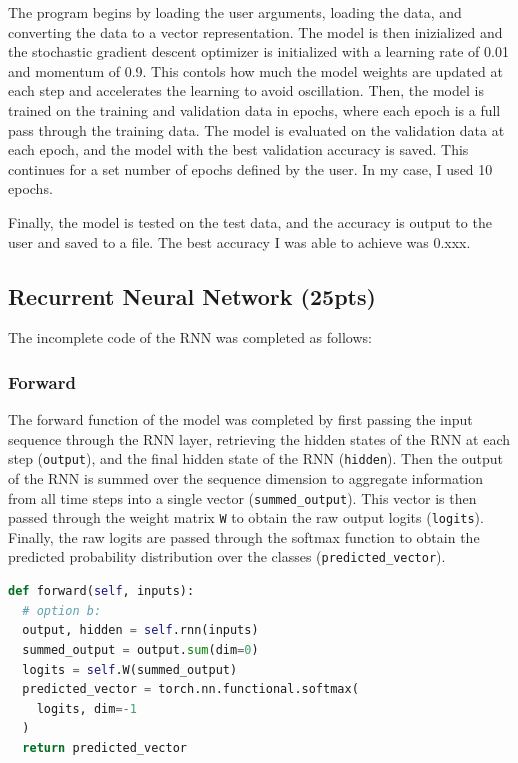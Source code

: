 \documentclass[conference]{IEEEtran}
\begin{document}
The program begins by loading the user arguments, loading the data, and converting the data to a vector representation. The model is then inizialized and the stochastic gradient descent optimizer is initialized with a learning rate of 0.01 and momentum of 0.9. This contols how much the model weights are updated at each step and accelerates the learning to avoid oscillation. Then, the model is trained on the training and validation data in epochs, where each epoch is a full pass through the training data. The model is evaluated on the validation data at each epoch, and the model with the best validation accuracy is saved. This continues for a set number of epochs defined by the user. In my case, I used 10 epochs.

Finally, the model is tested on the test data, and the accuracy is output to the user and saved to a file. The best accuracy I was able to achieve was 0.xxx.


\subsection{Recurrent Neural Network (25pts)}

The incomplete code of the RNN was completed as follows:

\subsubsection{Forward}

The forward function of the model was completed by first passing the input sequence through the RNN layer, retrieving the hidden states of the RNN at each step (\texttt{output}), and the final hidden state of the RNN (\texttt{hidden}). Then the output of the RNN is summed over the sequence dimension to aggregate information from all time steps into a single vector (\texttt{summed\_output}). This vector is then passed through the weight matrix \texttt{W} to obtain the raw output logits (\texttt{logits}). Finally, the raw logits are passed through the softmax function to obtain the predicted probability distribution over the classes (\texttt{predicted\_vector}).

\begin{lstlisting}[language=Python]
def forward(self, inputs):
  # option b:
  output, hidden = self.rnn(inputs)  
  summed_output = output.sum(dim=0)  
  logits = self.W(summed_output)  
  predicted_vector = torch.nn.functional.softmax(
    logits, dim=-1
  ) 
  return predicted_vector
\end{lstlisting}
\end{document}
